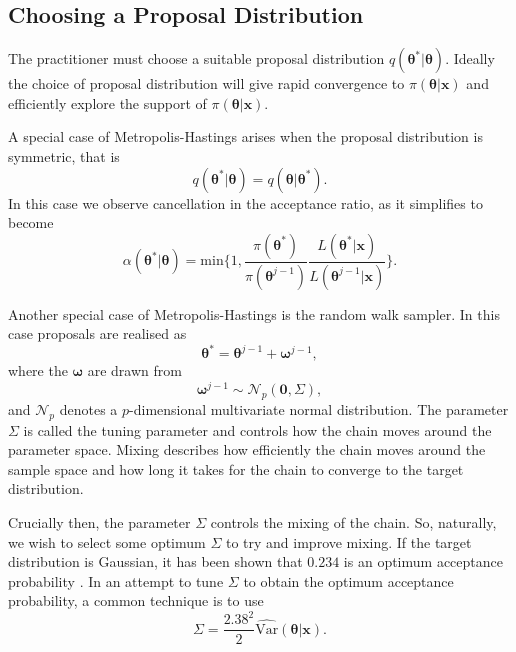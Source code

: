 \subsection*{Choosing a Proposal Distribution}
\label{ssec:proposal_distribution}
The practitioner must choose a suitable proposal distribution $q(\bm{\theta}^* | \bm{\theta})$. Ideally the choice of proposal distribution will give rapid convergence to $\pi(\bm{\theta} | \bm{x})$ and efficiently explore the support of $\pi(\bm{\theta} | \bm{x})$.

A special case of Metropolis-Hastings arises when the proposal distribution is symmetric, that is
\begin{equation*}
	q(\bm{\theta}^* | \bm{\theta}) = q(\bm{\theta} | \bm{\theta}^*).
\end{equation*}
In this case we observe cancellation in the acceptance ratio, as it simplifies to become 
\begin{equation*}
	\alpha({\bm{\theta}}^* | \bm{\theta}) = \text{min}\bigg\{ 1, \frac{\pi({\bm{\theta}}^*)}{\pi({\bm{\theta}}^{j-1})} \frac{L(\bm{\theta}^* | \bm{x})}{L({\bm{\theta}}^{j-1} | \bm{x})} \bigg\}.
\end{equation*}

Another special case of Metropolis-Hastings is the random walk sampler. In this case proposals are realised as
\begin{equation*}
	\bm{\theta}^* = \bm{\theta}^{j-1} + \bm{\omega}^{j-1},
\end{equation*}
where the $\bm{\omega}$ are drawn from
\begin{equation*}
	\bm{\omega}^{j-1} \sim \mathcal{N}_p(\bm{0}, \Sigma),
\end{equation*}
and $\mathcal{N}_p$ denotes a $p$-dimensional multivariate normal distribution. The parameter $\Sigma$ is called the tuning parameter and controls how the chain moves around the parameter space. Mixing describes how efficiently the chain moves around the sample space and how long it takes for the chain to converge to the target distribution.

Crucially then, the parameter $\Sigma$ controls the mixing of the chain. So, naturally, we wish to select some optimum $\Sigma$ to try and improve mixing. If the target distribution is Gaussian, it has been shown that $0.234$ is an optimum acceptance probability \citep{roberts01}. In an attempt to tune $\Sigma$ to obtain the optimum acceptance probability, a common technique is to use 
\begin{equation*}
	\Sigma = \frac{2.38^2}{2} \widehat{\text{Var}}(\bm{\theta} | \bm{x}).
\end{equation*}

